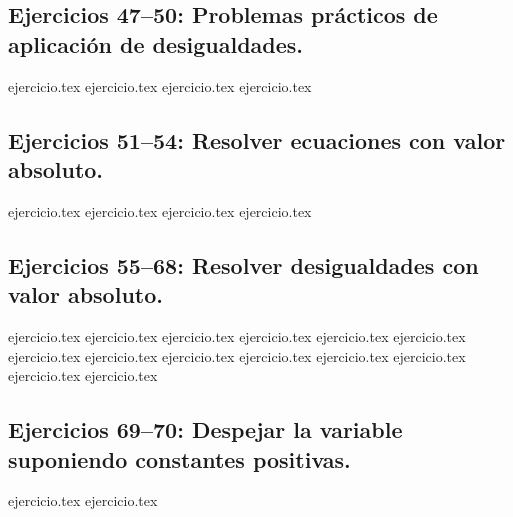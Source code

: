 \subsection*{Ejercicios 47--50: Problemas prácticos de aplicación de desigualdades.}
\begin{enumerate}
    \setcounter{enumi}{46}
    {ejercicio.tex}
    {ejercicio.tex}
    {ejercicio.tex}
    {ejercicio.tex}
\end{enumerate}

\subsection*{Ejercicios 51--54: Resolver ecuaciones con valor absoluto.}
\begin{enumerate}
    \setcounter{enumi}{50}
    {ejercicio.tex}
    {ejercicio.tex}
    {ejercicio.tex}
    {ejercicio.tex}
\end{enumerate}

\subsection*{Ejercicios 55--68: Resolver desigualdades con valor absoluto.}
\begin{enumerate}
    \setcounter{enumi}{54}
    {ejercicio.tex}
    {ejercicio.tex}
    {ejercicio.tex}
    {ejercicio.tex}
    {ejercicio.tex}
    {ejercicio.tex}
    {ejercicio.tex}
    {ejercicio.tex}
    {ejercicio.tex}
    {ejercicio.tex}
    {ejercicio.tex}
    {ejercicio.tex}
    {ejercicio.tex}
    {ejercicio.tex}
\end{enumerate}

\subsection*{Ejercicios 69--70: Despejar la variable suponiendo constantes positivas.}
\begin{enumerate}
    \setcounter{enumi}{68}
    {ejercicio.tex}
    {ejercicio.tex}
\end{enumerate}

